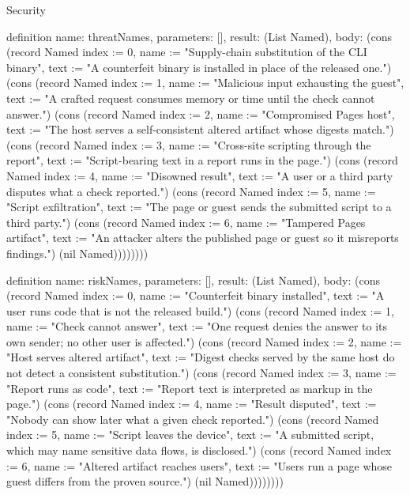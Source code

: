 \begin{lexlean}{Security}
\begin{semanticmodule}
definition{
  name: threatNames,
  parameters: [],
  result: (List Named),
  body: (cons (record Named {index := 0, name := "Supply-chain substitution of the CLI binary", text := "A counterfeit binary is installed in place of the released one."}) (cons (record Named {index := 1, name := "Malicious input exhausting the guest", text := "A crafted request consumes memory or time until the check cannot answer."}) (cons (record Named {index := 2, name := "Compromised Pages host", text := "The host serves a self-consistent altered artifact whose digests match."}) (cons (record Named {index := 3, name := "Cross-site scripting through the report", text := "Script-bearing text in a report runs in the page."}) (cons (record Named {index := 4, name := "Disowned result", text := "A user or a third party disputes what a check reported."}) (cons (record Named {index := 5, name := "Script exfiltration", text := "The page or guest sends the submitted script to a third party."}) (cons (record Named {index := 6, name := "Tampered Pages artifact", text := "An attacker alters the published page or guest so it misreports findings."}) (nil Named))))))))
}

definition{
  name: riskNames,
  parameters: [],
  result: (List Named),
  body: (cons (record Named {index := 0, name := "Counterfeit binary installed", text := "A user runs code that is not the released build."}) (cons (record Named {index := 1, name := "Check cannot answer", text := "One request denies the answer to its own sender; no other user is affected."}) (cons (record Named {index := 2, name := "Host serves altered artifact", text := "Digest checks served by the same host do not detect a consistent substitution."}) (cons (record Named {index := 3, name := "Report runs as code", text := "Report text is interpreted as markup in the page."}) (cons (record Named {index := 4, name := "Result disputed", text := "Nobody can show later what a given check reported."}) (cons (record Named {index := 5, name := "Script leaves the device", text := "A submitted script, which may name sensitive data flows, is disclosed."}) (cons (record Named {index := 6, name := "Altered artifact reaches users", text := "Users run a page whose guest differs from the proven source."}) (nil Named))))))))
}


\end{semanticmodule}
\end{lexlean}
